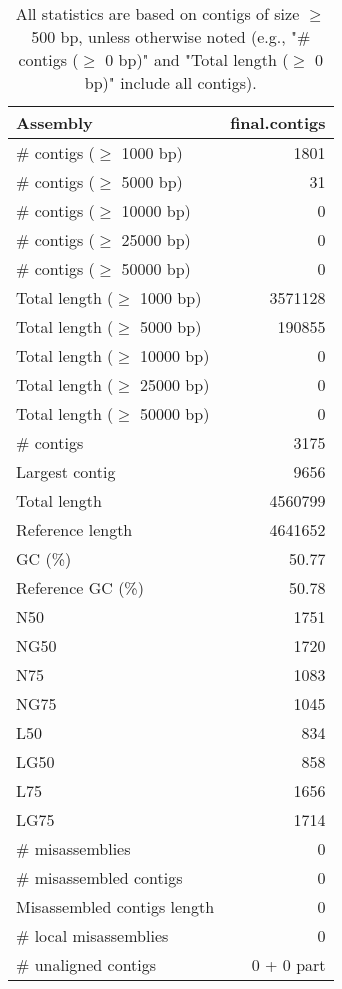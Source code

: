 \documentclass[12pt,a4paper]{article}
\begin{document}
\begin{table}[ht]
\begin{center}
\caption{All statistics are based on contigs of size $\geq$ 500 bp, unless otherwise noted (e.g., "\# contigs ($\geq$ 0 bp)" and "Total length ($\geq$ 0 bp)" include all contigs).}
\begin{tabular}{|l*{1}{|r}|}
\hline
Assembly & final.contigs \\ \hline
\# contigs ($\geq$ 1000 bp) & 1801 \\ \hline
\# contigs ($\geq$ 5000 bp) & 31 \\ \hline
\# contigs ($\geq$ 10000 bp) & 0 \\ \hline
\# contigs ($\geq$ 25000 bp) & 0 \\ \hline
\# contigs ($\geq$ 50000 bp) & 0 \\ \hline
Total length ($\geq$ 1000 bp) & 3571128 \\ \hline
Total length ($\geq$ 5000 bp) & 190855 \\ \hline
Total length ($\geq$ 10000 bp) & 0 \\ \hline
Total length ($\geq$ 25000 bp) & 0 \\ \hline
Total length ($\geq$ 50000 bp) & 0 \\ \hline
\# contigs & 3175 \\ \hline
Largest contig & 9656 \\ \hline
Total length & 4560799 \\ \hline
Reference length & 4641652 \\ \hline
GC (\%) & 50.77 \\ \hline
Reference GC (\%) & 50.78 \\ \hline
N50 & 1751 \\ \hline
NG50 & 1720 \\ \hline
N75 & 1083 \\ \hline
NG75 & 1045 \\ \hline
L50 & 834 \\ \hline
LG50 & 858 \\ \hline
L75 & 1656 \\ \hline
LG75 & 1714 \\ \hline
\# misassemblies & 0 \\ \hline
\# misassembled contigs & 0 \\ \hline
Misassembled contigs length & 0 \\ \hline
\# local misassemblies & 0 \\ \hline
\# unaligned contigs & 0 + 0 part \\ \hline

\end{tabular}
\end{center}
\end{table}
\end{document}
